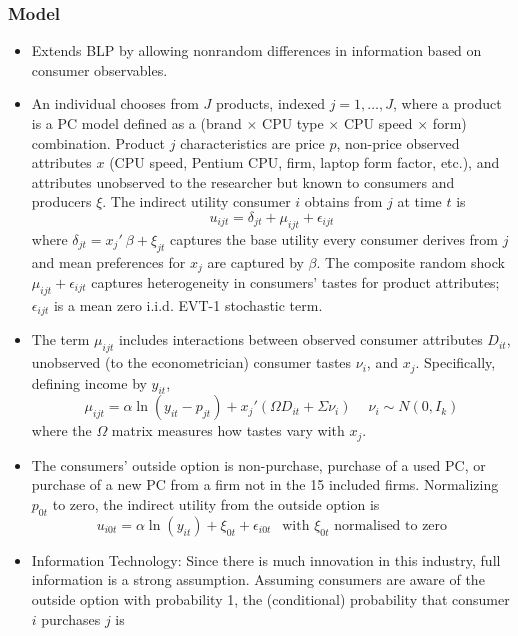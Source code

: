 \documentclass[11pt]{article}
\numberwithin{equation}{section}
\begin{document}
		\subsubsection*{Model}
		\begin{itemize}
    \item Extends BLP by allowing nonrandom differences in information based on consumer observables.
		\item An individual chooses from $J$ products, indexed $j=1,\dots,J$, where a product is a PC model defined as a (brand $\times$ CPU type $\times$ CPU speed $\times$ form) combination. Product $j$ characteristics are price $p$, non-price observed attributes $x$ (CPU speed, Pentium CPU, firm, laptop form factor, etc.), and attributes unobserved to the researcher but known to consumers and producers $\xi$. The indirect utility consumer $i$ obtains from $j$ at time $t$ is
		\begin{equation}
		u_{ijt} = \delta_{jt} + \mu_{ijt} + \epsilon_{ijt}
		\end{equation}
		where $\delta_{jt}=x_j'~\beta + \xi_{jt}$ captures the base utility every consumer derives from $j$ and mean preferences for $x_j$ are captured by $\beta$. The composite random shock $\mu_{ijt} + \epsilon_{ijt}$ captures heterogeneity in consumers' tastes for product attributes; $\epsilon_{ijt}$ is a mean zero i.i.d. EVT-1 stochastic term.
		\item The term $\mu_{ijt}$ includes interactions between observed consumer attributes $D_{it}$, unobserved (to the econometrician) consumer tastes $\nu_i$, and $x_j$. Specifically, defining income by $y_{it}$,
		\begin{equation}
		\mu_{ijt}=\alpha\ln(y_{it}-p_{jt}) + x_j'(\Omega D_{it} + \Sigma\nu_i) ~\quad \nu_i\sim N(0,I_k)
		\end{equation}
		where the $\Omega$ matrix measures how tastes vary with $x_j$.
		\item The consumers' outside option is non-purchase, purchase of a used PC, or purchase of a new PC from a firm not in the 15 included firms. Normalizing $p_{0t}$ to zero, the indirect utility from the outside option is
		\begin{equation}
		u_{i0t}=\alpha\ln(y_{it})+\xi_{0t}+\epsilon_{i0t} ~~\text{ with $\xi_{0t}$ normalised to zero}
		\end{equation}
		\item Information Technology: Since there is much innovation in this industry, full information is a strong assumption. Assuming consumers are aware of the outside option with probability 1, the (conditional) probability that consumer $i$ purchases $j$ is

\end{itemize}
\end{document}
